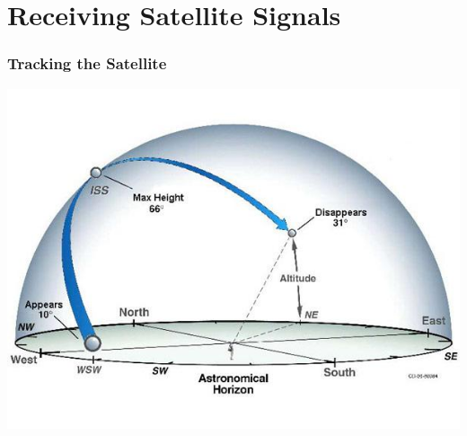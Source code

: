 \documentclass[]{beamer}
\begin{document}
\section[Reception]{Receiving Satellite Signals}
\frame{\sectionpage}
\begin{frame}
    \frametitle{Tracking the Satellite}
    \begin{center}
        \includegraphics[width=0.75\paperwidth,height=1.0\paperheight,keepaspectratio]{images/az-el-vis.png}
    \end{center}
\end{frame}
\end{document}
